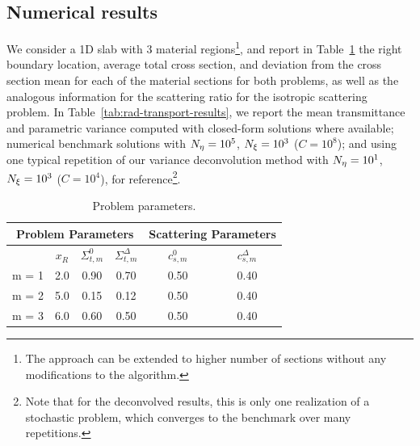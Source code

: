 \subsection{Numerical results}
We consider a 1D slab with 3 material regions\footnote{The approach can be extended to higher number of sections without any modifications to the algorithm.}, and report in Table~\ref{tab:prob-param} the right boundary location, average total cross section, and deviation from the cross section mean for each of the material sections for both problems, as well as the analogous information for the scattering ratio for the isotropic scattering problem. In Table~\ref{tab:rad-transport-results}, we report the mean transmittance and parametric variance computed with closed-form solutions where available; numerical benchmark solutions with ${N_\eta}=10^5$, ${N_\xi}=10^3$ ($C=10^8$); and using one typical repetition of our variance deconvolution method with ${N_\eta}=10^1$, ${N_\xi}=10^3$ ($C=10^4$), for reference\footnote{Note that for the deconvolved results, this is only one realization of a stochastic problem, which converges to the benchmark over many repetitions.}.

\begin{table}[ht]
    \centering
    \caption{Problem parameters.}
	\begin{tabular}{| c || c | c | c || c | c |} \hline
	\multicolumn{4}{|c||}{Problem Parameters} & \multicolumn{2}{|c|}{Scattering Parameters} \\ \hline
		 & $x_R$ & $\Sigma^0_{t,m}$ & $\Sigma_{t,m}^{\Delta}$ & $c^0_{s,m}$ & $c_{s,m}^{\Delta}$ \\ \hline
	m = 1 & 2.0 & 0.90 & 0.70 & 0.50 & 0.40 \\
	m = 2 & 5.0 & 0.15 & 0.12 & 0.50 & 0.40 \\
	m = 3 & 6.0 & 0.60 & 0.50 & 0.50 & 0.40 \\ \hline
	\end{tabular}
    \label{tab:prob-param}
\end{table}

